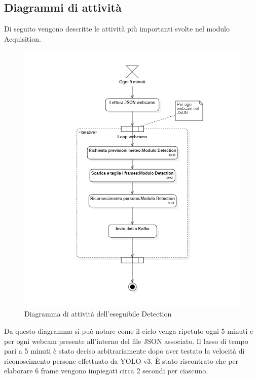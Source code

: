 \subsection{Diagrammi di attività}\label{ArchitetturaDelProdottoArchitetturaModuloAcquisitionDiagrammiDIAttività}
Di seguito vengono descritte le attività più importanti svolte nel modulo Acquisition.
\begin{figure}[H]
  \begin{center}
    \includegraphics[scale=0.8]{../immagini/diag_PB/detection.png}
    \caption{Diagramma di attività dell'eseguibile Detection}
  \end{center}
\end{figure}


Da questo diagramma si può notare come il ciclo venga ripetuto ogni 5 minuti e per ogni webcam presente all'interno del file JSON associato.
Il lasso di tempo pari a 5 minuti è stato deciso arbitrariamente dopo aver testato la velocità di riconoscimento persone effettuato da YOLO v3.
È stato riscontrato che per elaborare 6 frame vengono impiegati circa 2 secondi per ciascuno.


